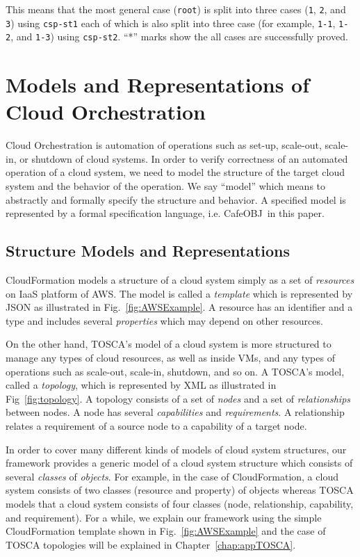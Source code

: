 \documentclass[12pt]{report}
\newcommand{\cafeobj}{{\sf CafeOBJ}~}
\begin{document}
This means that the most general case ({\tt root}) is split into three
cases ({\tt 1}, {\tt 2}, and {\tt 3}) using {\tt csp-st1} each of
which is also split into three case (for example, {\tt 1-1},
{\tt 1-2}, and {\tt 1-3}) using {\tt csp-st2}.  ``*'' marks show the
all cases are successfully proved.

\chapter{Models and Representations of Cloud Orchestration}
\label{chap:model}
Cloud Orchestration is automation of operations such as set-up,
scale-out, scale-in, or shutdown of cloud systems. In order to verify
correctness of an automated operation of a cloud system, we need to
model the structure of the target cloud system and the behavior of the
operation. We say ``model'' which means to abstractly and formally
specify the structure and behavior. A specified model is represented
by a formal specification language, i.e. \cafeobj in this paper.

\section{Structure Models and Representations}
\label{sec:structuremodel}
CloudFormation models a structure of a cloud system simply as a set
of {\it resources} on IaaS platform of AWS. The model is called a {\it
  template} which is represented by JSON as illustrated in
Fig.~\ref{fig:AWSExample}.  A resource has an identifier and a type
and includes several {\it properties} which may depend on other
resources.

On the other hand, TOSCA's model of a cloud system is more structured
to manage any types of cloud resources, as well as inside VMs, and any
types of operations such as scale-out, scale-in, shutdown, and so on.
A TOSCA's model, called a {\it topology}, which is represented by XML
as illustrated in Fig~\ref{fig:topology}. A topology consists of a set
of {\it nodes} and a set of {\it relationships} between nodes. A node
has several {\it capabilities} and {\it requirements}. A relationship
relates a requirement of a source node to a capability of a target
node.

In order to cover many different kinds of models of cloud system
structures, our framework provides a generic model of a cloud system
structure which consists of several {\it classes} of {\it
  objects}. For example, in the case of CloudFormation, a cloud system
consists of two classes (resource and property) of objects whereas
TOSCA models that a cloud system consists of four classes (node,
relationship, capability, and requirement). For a while, we explain
our framework using the simple CloudFormation template shown in
Fig.~\ref{fig:AWSExample} and the case of TOSCA topologies will be
explained in Chapter~\ref{chap:appTOSCA}.
\end{document}
